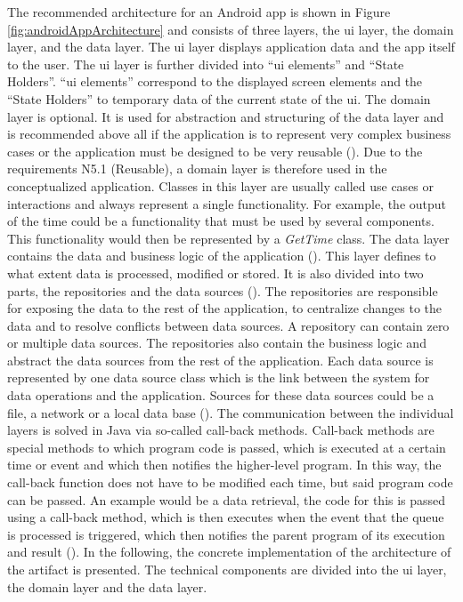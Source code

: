 The recommended architecture for an Android app is shown in Figure \ref{fig:androidAppArchitecture} and consists of three layers, the \ac{ui} layer, the domain layer, and the data layer. The \ac{ui} layer displays application data and the app itself to the user. The \ac{ui} layer is further divided into \enquote{\ac{ui} elements} and \enquote{State Holders}. \enquote{\ac{ui} elements} correspond to the displayed screen elements and the \enquote{State Holders} to temporary data of the current state of the \ac{ui}. The domain layer is optional. It is used for abstraction and structuring of the data layer and is recommended above all if the application is to represent very complex business cases or the application must be designed to be very reusable (\cite{Google.2023}). Due to the requirements N5.1 (Reusable), a domain layer is therefore used in the conceptualized application. Classes in this layer are usually called use cases or interactions and always represent a single functionality. For example, the output of the time could be a functionality that must be used by several components. This functionality would then be represented by a \textit{GetTime} class. The data layer contains the data and business logic of the application (\cite{Google.2023}). This layer defines to what extent data is processed, modified or stored. It is also divided into two parts, the repositories and the data sources (\cite{Google.2023}). The repositories are responsible for exposing the data to the rest of the application, to centralize changes to the data and to resolve conflicts between data sources. A repository can contain zero or multiple data sources. The repositories also contain the business logic and abstract the data sources from the rest of the application. Each data source is represented by one data source class which is the link between the system for data operations and the application. Sources for these data sources could be a file, a network or a local data base (\cite{Google.2023}). The communication between the individual layers is solved in Java via so-called call-back methods. Call-back methods are special methods to which program code is passed, which is executed at a certain time or event and which then notifies the higher-level program. In this way, the call-back function does not have to be modified each time, but said program code can be passed. An example would be a data retrieval, the code for this is passed using a call-back method, which is then executes when the event that the queue is processed is triggered, which then notifies the parent program of its execution and result (\cite{Zaccagnino.2020}). In the following, the concrete implementation of the architecture of the artifact is presented. The technical components are divided into the \ac{ui} layer, the domain layer and the data layer. 

